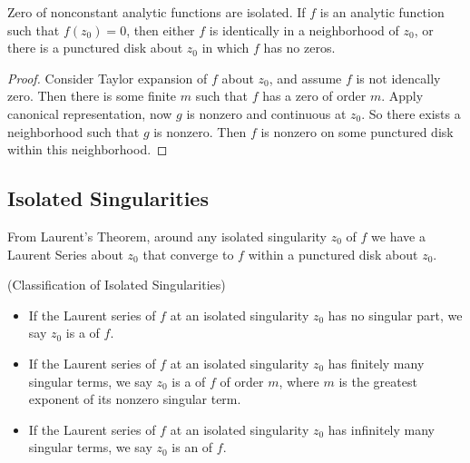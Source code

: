 \begin{corollary}
	Zero of nonconstant analytic functions are isolated. If $f$ is an analytic function such that $f(z_0) = 0$, then either $f$ is identically in a neighborhood of $z_0$, or there is a punctured disk about $z_0$ in which $f$ has no zeros.
\end{corollary}
\begin{proof}
	Consider Taylor expansion of $f$ about $z_0$, and assume $f$ is not idencally zero. Then there is some finite $m$ such that $f$ has a zero of order $m$. Apply canonical representation, now $g$ is nonzero and continuous at $z_0$. So there exists a neighborhood such that $g$ is nonzero. Then $f$ is nonzero on some punctured disk within this neighborhood.
\end{proof}


\subsection{Isolated Singularities}

From Laurent's Theorem, around any isolated singularity $z_0$ of $f$ we have a Laurent Series about $z_0$ that converge to $f$ within a punctured disk about $z_0$.

\begin{definition}(Classification of Isolated Singularities)
	\begin{itemize}
		\item 
	If the Laurent series of $f$ at an isolated singularity $z_0$ has no singular part, we say $z_0$ is a  of $f$.
	\item
	If the Laurent series of $f$ at an isolated singularity $z_0$ has finitely many singular terms, we say $z_0$ is a  of $f$ of order $m$, where $m$ is the greatest exponent of its nonzero singular term.
	\item
	If the Laurent series of $f$ at an isolated singularity $z_0$ has infinitely many singular terms, we say $z_0$ is an  of $f$.
	\end{itemize}
\end{definition}

